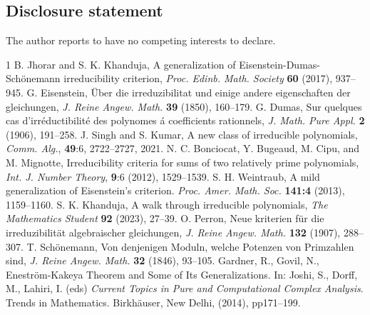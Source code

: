 \documentclass[12pt]{amsart}%
\begin{document}
\subsection*{Disclosure statement}
The author reports to have no competing interests to declare.
\begin{thebibliography}{1}
 B. Jhorar and S. K. Khanduja, A generalization of Eisenstein-Dumas-Sch\"onemann irreducibility criterion, \emph{Proc. Edinb. Math. Society} \textbf{60} (2017), 937--945.
 G. Eisenstein, \"Uber die irreduzibilitat und einige andere eigenschaften der gleichungen, \emph{J. Reine Angew. Math.} \textbf{39} (1850), 160--179.
 G. Dumas, Sur quelques cas d'irr\'eductibilit\'e des polynomes \'a coefficients rationnels, \emph{J. Math. Pure Appl.} \textbf{2} (1906), 191--258.
 J. Singh and S. Kumar, {{A new class of irreducible polynomials}}, \emph{Comm. Alg.}, {\textbf{49}:6}, 2722--2727, 2021. %
 N. C. Bonciocat, Y. Bugeaud, M. Cipu, and M. Mignotte, Irreducibility criteria for sums of two relatively prime polynomials, \emph{Int. J. Number Theory}, \textbf{9}:6 (2012), 1529--1539.
  S. H. Weintraub, A mild generalization of Eisenstein's criterion. \emph{Proc. Amer. Math. Soc.} {\bf{141:4}} (2013), 1159--1160.
 S. K. Khanduja, A walk through irreducible polynomials, \emph{The Mathematics Student} \textbf{92} (2023), 27--39.
 O. Perron, Neue kriterien f\"ur die irreduzibilit\"at algebraischer  gleichungen, \emph{J. Reine Angew. Math.} \textbf{132} (1907), 288--307.
 T. Sch\"onemann, Von denjenigen Moduln, welche Potenzen von Primzahlen sind, \emph{J. Reine Angew. Math.} \textbf{32} (1846), 93--105.
 Gardner, R., Govil, N., Enestr\"om-Kakeya Theorem and Some of Its Generalizations. In: Joshi, S., Dorff, M., Lahiri, I. (eds) \emph{Current Topics in Pure and Computational Complex Analysis}. Trends in Mathematics. Birkhäuser, New Delhi, (2014), pp171--199. %
\end{thebibliography}
\end{document}
